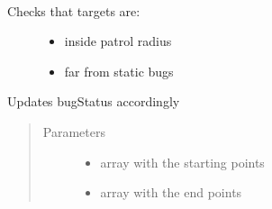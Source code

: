 \documentclass[letterpaper,10pt,english]{sphinxmanual}
\begin{document}
\begin{fulllineitems}
\label{\detokenize{reference:taipanPyRouter.checkValidTargets}}~\begin{description}
\item[{Checks that targets are:}] \leavevmode\begin{itemize}
\item {} 
inside patrol radius

\item {} 
far from static bugs

\end{itemize}

\end{description}

Updates bugStatus accordingly
\begin{quote}\begin{description}
\item[{Parameters}] \leavevmode\begin{itemize}
\item {} 
 \textendash{} array with the starting points

\item {} 
 \textendash{} array with the end points

\end{itemize}

\end{description}\end{quote}

\end{fulllineitems}

\end{document}

